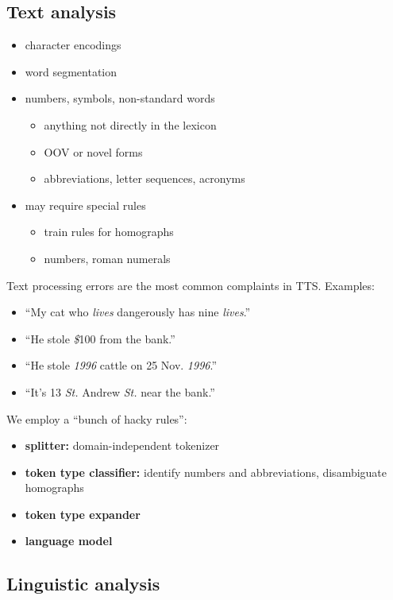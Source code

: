 \documentclass[11pt]{article}
\begin{document}
\subsection{Text analysis}
\begin{itemize}
    \item character encodings
    \item word segmentation
    \item numbers, symbols, non-standard words
        \begin{itemize}
            \item anything not directly in the lexicon
            \item OOV or novel forms
            \item abbreviations, letter sequences, acronyms
        \end{itemize}
    \item may require special rules
        \begin{itemize}
            \item train rules for homographs
            \item numbers, roman numerals
        \end{itemize}
\end{itemize}
Text processing errors are the most common complaints in TTS. Examples:
\begin{itemize}
    \item ``My cat who \textit{lives} dangerously has nine \textit{lives}.''
    \item ``He stole \textit{\$}100 from the bank.''
    \item ``He stole \textit{1996} cattle on 25 Nov. \textit{1996}.''
    \item ``It's 13 \textit{St.} Andrew \textit{St.} near the bank.''
\end{itemize}
We employ a ``bunch of hacky rules'':
\begin{itemize}
    \item \textbf{splitter:} domain-independent tokenizer
    \item \textbf{token type classifier:} identify numbers and abbreviations, disambiguate homographs
    \item \textbf{token type expander}
    \item \textbf{language model}
\end{itemize}

\subsection{Linguistic analysis}
\end{document}

